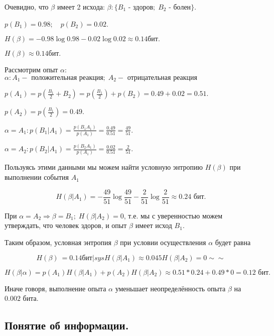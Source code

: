 ﻿\documentclass[a4paper,12pt]{report}
\begin{document}
	 Очевидно, что $\beta$ имеет 2 исхода: $\beta : \{B_1\mbox{ - здоров}; \; B_2\mbox{ - болен}\}$.
	
	$p(B_1) = 0.98; \quad p(B_2) = 0.02$.
	
	$H(\beta) = - 0.98 \log 0.98 - 0.02 \log 0.02 \approx 0.14 \mbox{бит}.$
	
	$H(\beta) \approx 0.14 бит.$
	 
	Рассмотрим опыт $\alpha$: \; $\alpha : {A_1 - \mbox{ положительная реакция}; \; A_2 - \mbox{ отрицательная реакция}}$

	$  p(A_1) = p(\frac{B_1}{2} + B_2) 
	          = p(\frac{B_1}{2}) + p(B_2)
	          = 0.49 + 0.02
	          = 0.51
	$.

	$  p(A_2) = p(\frac{B_1}{2}) 
	          = 0.49
	$.

	$
	  \alpha = A_1 : p(B_1|A_1)
	         = \frac{p(B_1 A_1)}{p(A_1)}
	         = \frac{0.49}{0.51}
	         = \frac{49}{51}.
	$
	
	$
	  \alpha = A_2 : p(B_2|A_1) 
	         = \frac{p(B_2 A_1)}{p(A_1)} 
	         = \frac{0.02}{0.51} 
	         = \frac{2}{51}. 
	$
	
	Пользуясь этими данными мы можем найти условную энтропию $H(\beta)$ при выполнении события $A_1$

	$$
	  H(\beta|A_1) = - \frac{49}{51} \log \frac{49}{51}
	                 - \frac{2}{51}  \log \frac{2}{51}
	         \approx 0.24 \mbox{ бит.}
	$$
	
	При $\alpha = A_2 \Rightarrow \beta = B_1; \; H(\beta|A_2) = 0$, т.е. мы с уверенностью можем утверждать, что человек здоров, и опыт $\beta$ имеет исход $B_1$.
	
	Таким образом, условная энтропия $\beta$ при условии осуществления $\alpha$ будет равна 
	
	$$
	  H(\beta) ~= 0.14 бит | sys 	H(\beta|A_1) \approx 0.045
					H(\beta|A_2) = 0 \sim \sim
	$$
				
	$$
	  H(\beta|\alpha) = p(A_1)H(\beta|A_1) + p(A_2)H(\beta|A_2) 
	            \approx 0.51 * 0.24 + 0.49 * 0
	                  = 0.12 \mbox{ бит.}
	$$
	
	Иначе говоря, выполнение опыта $\alpha$ уменьшает неопределённость опыта $\beta$ на $0.002$ бита.
	
	
	
	\subsection{Понятие об информации.}
	
\end{document}
